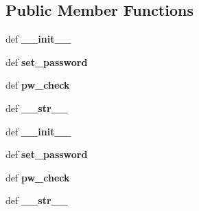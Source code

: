 \subsection*{Public Member Functions}
\begin{DoxyCompactItemize}
\item 
\hypertarget{classpassword_1_1password_1_1Password_a0a95b24e19fbdb3c2e9f12a2895ad5bd}{def {\bfseries \-\_\-\-\_\-init\-\_\-\-\_\-}}\label{classpassword_1_1password_1_1Password_a0a95b24e19fbdb3c2e9f12a2895ad5bd}

\item 
\hypertarget{classpassword_1_1password_1_1Password_ae82245d2820e1e83b5f13992f92d74ed}{def {\bfseries set\-\_\-password}}\label{classpassword_1_1password_1_1Password_ae82245d2820e1e83b5f13992f92d74ed}

\item 
\hypertarget{classpassword_1_1password_1_1Password_adf76b94e834adb438fed7eb1437579be}{def {\bfseries pw\-\_\-check}}\label{classpassword_1_1password_1_1Password_adf76b94e834adb438fed7eb1437579be}

\item 
\hypertarget{classpassword_1_1password_1_1Password_a96903b99a6210bace82f2c2a122a053f}{def {\bfseries \-\_\-\-\_\-str\-\_\-\-\_\-}}\label{classpassword_1_1password_1_1Password_a96903b99a6210bace82f2c2a122a053f}

\item 
\hypertarget{classpassword_1_1password_1_1Password_a0a95b24e19fbdb3c2e9f12a2895ad5bd}{def {\bfseries \-\_\-\-\_\-init\-\_\-\-\_\-}}\label{classpassword_1_1password_1_1Password_a0a95b24e19fbdb3c2e9f12a2895ad5bd}

\item 
\hypertarget{classpassword_1_1password_1_1Password_ae82245d2820e1e83b5f13992f92d74ed}{def {\bfseries set\-\_\-password}}\label{classpassword_1_1password_1_1Password_ae82245d2820e1e83b5f13992f92d74ed}

\item 
\hypertarget{classpassword_1_1password_1_1Password_adf76b94e834adb438fed7eb1437579be}{def {\bfseries pw\-\_\-check}}\label{classpassword_1_1password_1_1Password_adf76b94e834adb438fed7eb1437579be}

\item 
\hypertarget{classpassword_1_1password_1_1Password_a96903b99a6210bace82f2c2a122a053f}{def {\bfseries \-\_\-\-\_\-str\-\_\-\-\_\-}}\label{classpassword_1_1password_1_1Password_a96903b99a6210bace82f2c2a122a053f}

\end{DoxyCompactItemize}
